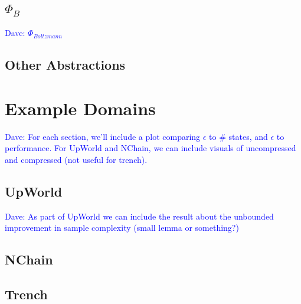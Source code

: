 \documentclass{article}
\newcommand\dnote[1]{\textcolor{blue}{Dave: #1}}
\begin{document}
\subsection{$\Phi_B$}
\dnote{$\Phi_{Boltzmann}$}


\subsection{Other Abstractions}





\section{Example Domains}

\dnote{For each section, we'll include a plot comparing $\epsilon$ to \# states, and $\epsilon$ to performance. For UpWorld and NChain, we can include visuals of uncompressed and compressed (not useful for trench).}

\subsection{UpWorld}

\dnote{As part of UpWorld we can include the result about the unbounded improvement in sample complexity (small lemma or something?)}



\subsection{NChain}



\subsection{Trench}

\end{document}
